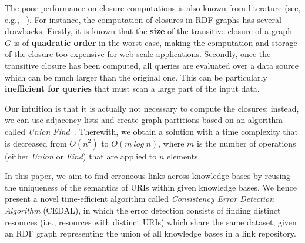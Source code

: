 The poor performance on closure computations is also known from literature (see, e.g., ~\cite{arenas2008extension}). For instance, the computation of closures in RDF graphs has several drawbacks. Firstly, it is known that the \textbf{size} of the transitive closure of a graph $G$ is of \textbf{quadratic order} in the worst case, making the computation and storage of the closure too expensive for web-scale applications. Secondly, once the transitive closure has been computed, all queries are evaluated over a data source which can be much larger than the original one. This can be particularly \textbf{inefficient for queries} that must scan a large part of the input data.

Our intuition is that it is actually not necessary to compute the closures; instead, we can use adjacency lists and create graph partitions based on an algorithm called \emph{Union Find}~\cite{Tarjan:1975:EGB:321879.321884}. Therewith, we obtain a solution with a time complexity that is decreased from $O(n^2)$ to $O(m~log~n)$, where $m$ is the number of operations (either \emph{Union} or \emph{Find}) that are applied to $n$ elements.

In this paper, we aim to find erroneous links across knowledge bases by reusing the uniqueness of the semantics of URIs within given knowledge bases. We hence present a novel time-efficient algorithm called \textit{Consistency Error Detection Algorithm} (CEDAL), in which the error detection consists of finding distinct resources (i.e., resources with distinct URIs) which share the same dataset, given an RDF graph representing the union of all knowledge bases in a link repository.


